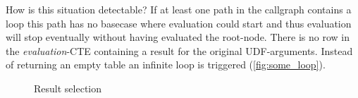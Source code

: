 How is this situation detectable? If at least one path in the callgraph contains a loop this path has no basecase where evaluation could start and thus evaluation will stop eventually without having evaluated the root-node. There is no row in the \textit{evaluation}-CTE containing a result for the original UDF-arguments. Instead of returning an empty table an infinite loop is triggered (\autoref{fig:some_loop}).

\begin{figure}[h!]
    \centering
    \caption{Result selection}
    \label{macro:result_collection}
    \vspace*{-3cm}
\end{figure}
